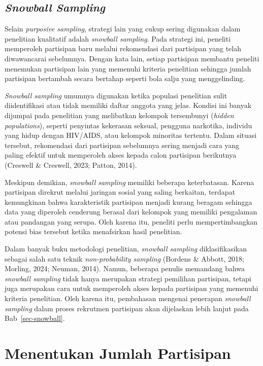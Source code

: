 \documentclass[
  indonesian,
  letterpaper,
  DIV=11,
  numbers=noendperiod]{scrreprt}
\begin{document}
\subsection{\texorpdfstring{\emph{Snowball
Sampling}}{Snowball Sampling}}\label{snowball-sampling}

Selain \emph{purposive sampling}, strategi lain yang cukup sering
digunakan dalam penelitian kualitatif adalah \emph{snowball sampling}.
Pada strategi ini, peneliti memperoleh partisipan baru melalui
rekomendasi dari partisipan yang telah diwawancarai sebelumnya. Dengan
kata lain, setiap partisipan membantu peneliti menemukan partisipan lain
yang memenuhi kriteria penelitian sehingga jumlah partisipan bertambah
secara bertahap seperti bola salju yang menggelinding.

\emph{Snowball sampling} umumnya digunakan ketika populasi penelitian
sulit diidentifikasi atau tidak memiliki daftar anggota yang jelas.
Kondisi ini banyak dijumpai pada penelitian yang melibatkan kelompok
tersembunyi (\emph{hidden populations}), seperti penyintas kekerasan
seksual, pengguna narkotika, individu yang hidup dengan HIV/AIDS, atau
kelompok minoritas tertentu. Dalam situasi tersebut, rekomendasi dari
partisipan sebelumnya sering menjadi cara yang paling efektif untuk
memperoleh akses kepada calon partisipan berikutnya (Creswell \&
Creswell, 2023; Patton, 2014).

Meskipun demikian, \emph{snowball sampling} memiliki beberapa
keterbatasan. Karena partisipan direkrut melalui jaringan sosial yang
saling berkaitan, terdapat kemungkinan bahwa karakteristik partisipan
menjadi kurang beragam sehingga data yang diperoleh cenderung berasal
dari kelompok yang memiliki pengalaman atau pandangan yang serupa. Oleh
karena itu, peneliti perlu mempertimbangkan potensi bias tersebut ketika
menafsirkan hasil penelitian.

Dalam banyak buku metodologi penelitian, \emph{snowball sampling}
diklasifikasikan sebagai salah satu teknik \emph{non-probability
sampling} (Bordens \& Abbott, 2018; Morling, 2024; Neuman, 2014). Namun,
beberapa penulis memandang bahwa \emph{snowball sampling} tidak hanya
merupakan strategi pemilihan partisipan, tetapi juga merupakan cara
untuk memperoleh akses kepada partisipan yang memenuhi kriteria
penelitian. Oleh karena itu, pembahasan mengenai penerapan
\emph{snowball sampling} dalam proses rekrutmen partisipan akan
dijelaskan lebih lanjut pada Bab~\ref{sec-snowball}.

\section{Menentukan Jumlah
Partisipan}\label{menentukan-jumlah-partisipan}
\end{document}
